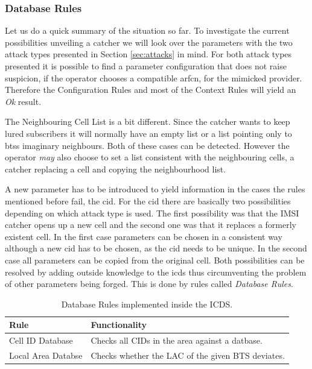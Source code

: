 \subsubsection{Database Rules}
Let us do a quick summary of the situation so far.
To investigate the current possibilities unveiling a catcher we will look over the parameters with the two attack types presented in Section \ref{sec:attacks} in mind.
For both attack types presented it is possible to find a parameter configuration that does not raise suspicion, if the operator chooses a compatible \gls{arfcn}, \etc for the mimicked provider.
Therefore the Configuration Rules and most of the Context Rules will yield an \emph{Ok} result.

The Neighbouring Cell List is a bit different.
Since the catcher wants to keep lured subscribers it will normally have an empty list or a list pointing only to \glspl{bts} imaginary neighbours. 
Both of these cases can be detected.
However the operator \emph{may} also choose to set a list consistent with the neighbouring cells, \eg a catcher replacing a cell and copying the neighbourhood list.

A new parameter has to be introduced to yield information in the cases the rules mentioned before fail, the \gls{cid}.
For the \gls{cid} there are basically two possibilities depending on which attack type is used.
The first possibility was that the IMSI catcher opens up a new cell and the second one was that it replaces a formerly existent cell.
In the first case parameters can be chosen in a consistent way although a new \gls{cid} has to be chosen, as the \gls{cid} needs to be unique.
In the second case all parameters can be copied from the original cell.
Both possibilities can be resolved by adding outside knowledge to the \gls{icds} thus circumventing the problem of other parameters being forged.
This is done by rules called \emph{Database Rules}.

\begin{table}
\centering
\begin{tabular}{ll}
\toprule
Rule					&Functionality\\
\midrule
Cell ID Database		&Checks all CIDs in the area against a datbase.\\
Local Area Databse 		&Checks whether the LAC of the given BTS deviates.\\
\bottomrule
\end{tabular}
\caption{Database Rules implemented inside the ICDS.}
\label{tab:database_rules}
\end{table}

